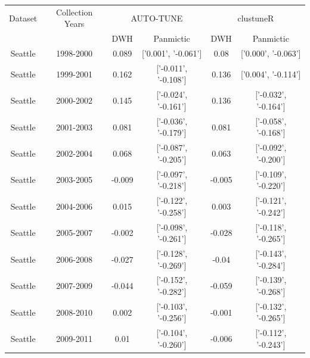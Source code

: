 \documentclass[utf8]{FrontiersinHarvard} %
\begin{document}
\begin{table}[h]
	\vspace{8pt}
	\centering
	\begin{tabular}{|c|c|c|c|c|c|}
		\hline
		Dataset   & Collection Years & \multicolumn{2}{c|}{AUTO-TUNE} & \multicolumn{2}{c|}{clustuneR}                                 \\
		\cline{3-6}
		          &                  & DWH                            & Panmictic                      & DWH    & Panmictic            \\
		\hline
		Seattle   & 1998-2000        & 0.089                          & ['0.001', '-0.061']            & 0.08   & ['0.000', '-0.063']  \\
		Seattle   & 1999-2001        & 0.162                          & ['-0.011', '-0.108']           & 0.136  & ['0.004', '-0.114']  \\
		Seattle   & 2000-2002        & 0.145                          & ['-0.024', '-0.161']           & 0.136  & ['-0.032', '-0.164'] \\
		Seattle   & 2001-2003        & 0.081                          & ['-0.036', '-0.179']           & 0.081  & ['-0.058', '-0.168'] \\
		Seattle   & 2002-2004        & 0.068                          & ['-0.087', '-0.205']           & 0.063  & ['-0.092', '-0.200'] \\
		Seattle   & 2003-2005        & -0.009                         & ['-0.097', '-0.218']           & -0.005 & ['-0.109', '-0.220'] \\
		Seattle   & 2004-2006        & 0.015                          & ['-0.122', '-0.258']           & 0.003  & ['-0.121', '-0.242'] \\
		Seattle   & 2005-2007        & -0.002                         & ['-0.098', '-0.261']           & -0.028 & ['-0.118', '-0.265'] \\
		Seattle   & 2006-2008        & -0.027                         & ['-0.128', '-0.269']           & -0.04  & ['-0.143', '-0.284'] \\
		Seattle   & 2007-2009        & -0.044                         & ['-0.152', '-0.282']           & -0.059 & ['-0.139', '-0.268'] \\
		Seattle   & 2008-2010        & 0.002                          & ['-0.103', '-0.256']           & -0.001 & ['-0.132', '-0.265'] \\
		Seattle   & 2009-2011        & 0.01                           & ['-0.104', '-0.260']           & -0.006 & ['-0.112', '-0.243'] \\

\end{tabular}
\end{table}
\end{document}
